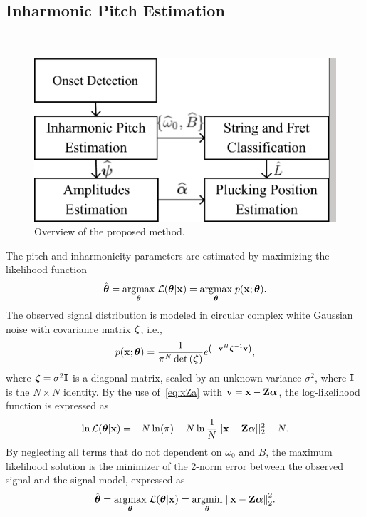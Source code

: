 \documentclass{article}
\begin{document}
\subsection{Inharmonic Pitch Estimation} %
\label{sec:proposed_estimator}
\begin{figure}[t]\
  \centering
  \centerline{\includegraphics[width=.75\columnwidth]{img/block2.png}}\vspace{-2mm}
  \caption{Overview of the proposed method.}\label{fig:overview}\vspace{-2mm}
\end{figure}
The pitch and inharmonicity parameters are estimated by maximizing the likelihood function %
\begin{equation}
    \hat{\boldsymbol\theta} = \underset{\text{\boldmath$\theta$}}{\operatorname{argmax}}\;{\mathcal{L}(\text{\boldmath$\theta$} | \mathbf x)} = \underset{\text{\boldmath$\theta$}}{\operatorname{argmax}}\;{p(\mathbf x ; \text{\boldmath$\theta$})}.
\end{equation}
The observed signal distribution is modeled in circular complex white Gaussian noise with covariance matrix $\boldsymbol{\zeta}$, i.e., 
\begin{equation} 
    p(\mathbf x ; \text{\boldmath$\theta$}) = \frac{1}{\pi^N\det{(\boldsymbol{\zeta})}} e^{\left(-\mathbf v^H\boldsymbol{\zeta}^{-1}\mathbf v\right)},
\end{equation}
where $\boldsymbol{\zeta}=\sigma^2\mathbf{I}$ is a diagonal matrix, scaled by an unknown variance $\sigma^2$, where $\mathbf{I}$ is the $N \times N$ identity. By the use of~\eqref{eq:xZa} with $\mathbf v = \mathbf x - \mathbf{Z} \text{\boldmath$\alpha$}$, 
the log-likelihood function is expressed as
\begin{equation}\label{eq:log_likelihood2}
    \ln\mathcal{L}(\text{\boldmath$\theta$}|\mathbf x) = -N \ln(\pi) - N \ln \frac{1}{N}|| \mathbf x-\mathbf{Z} \text{\boldmath$\alpha$} ||_2^2 - N.
\end{equation}
By neglecting all terms that do not dependent on $\omega_0$ and $B$, the maximum likelihood solution is the minimizer of the 2-norm error between the observed signal and the signal model, expressed as
\begin{equation}
  \hat{\boldsymbol\theta} =  \underset{\text{\boldmath$\theta$}}{\operatorname{argmax}}\;{\mathcal{L}(\text{\boldmath$\theta$} | \mathbf x)}  =\underset{\text{\boldmath$\theta$}}{\operatorname{argmin}}\;{\left\lVert\mathbf x-\mathbf{Z} \text{\boldmath$\alpha$}\right\rVert_2^2}.
\end{equation}
\end{document}
